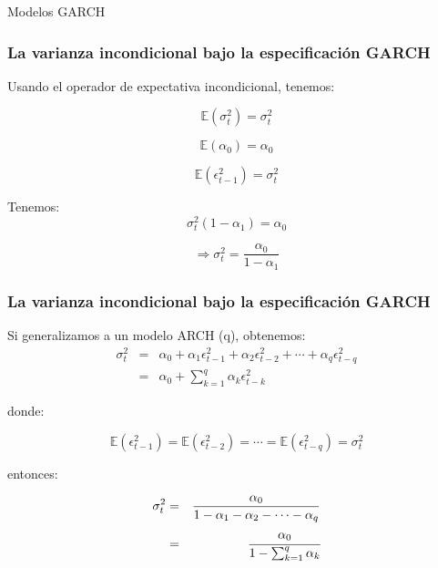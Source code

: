 \documentclass[xcolor=(list of options)]{beamer}
\begin{document}
\begin{section}{Modelos GARCH}
\begin{frame}
\end{frame}

\begin{frame}
\frametitle{La varianza incondicional bajo la especificación GARCH}


Usando el operador de expectativa incondicional, tenemos:

\[
\mathbb{E}\left(\sigma_{t}^{2}\right)=\sigma_{t}^{2}
\]


\[
\mathbb{E}\left(\alpha_{0}\right)=\alpha_{0}
\]


\[
\mathbb{E}\left(\epsilon_{t-1}^{2}\right)=\sigma_{t}^{2}
\]


\medskip{}


Tenemos:\\
\begin{equation}
\sigma_{t}^{2}\left(1-\alpha_{1}\right)=\alpha_{0}
\end{equation}


\begin{equation}
\Rightarrow\sigma_{t}^{2}=\frac{\alpha_{0}}{1-\alpha_{1}}
\end{equation}


\medskip{}

\end{frame}

\begin{frame}
\frametitle{La varianza incondicional bajo la especificación GARCH}


Si generalizamos a un modelo ARCH (q), obtenemos:\\
\begin{eqnarray}
\sigma_{t}^{2} & = & \alpha_{0}+\alpha_{1}\epsilon_{t-1}^{2}+\alpha_{2}\epsilon_{t-2}^{2}+\cdots+\alpha_{q}\epsilon_{t-q}^{2}\nonumber \\
 & = & \alpha_{0}+\sum_{k=1}^{q}\alpha_{k}\epsilon_{t-k}^{2}
\end{eqnarray}


donde:

\[
\mathbb{E}\left(\epsilon_{t-1}^{2}\right)=\mathbb{E}\left(\epsilon_{t-2}^{2}\right)=\cdots=\mathbb{E}\left(\epsilon_{t-q}^{2}\right)=\sigma_{t}^{2}
\]


entonces:

\begin{eqnarray}
\sigma_{t}^{2} & = & \frac{\alpha_{0}}{1-\alpha_{1}-\alpha_{2}-\cdots-\alpha_{q}}\nonumber \\
 & = & \cfrac{\alpha_{0}}{1-\sum_{k=1}^{q}\alpha_{k}}
\end{eqnarray}



\end{frame}
\end{section}
\end{document}

